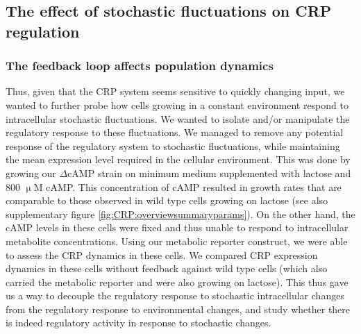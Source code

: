 \subsection*{The effect of stochastic fluctuations on CRP regulation}

\subsubsection*{The feedback loop affects population dynamics}

Thus, given that the CRP system seems sensitive to quickly changing input, we wanted to further probe how cells growing in a constant environment respond to intracellular stochastic fluctuations.
%
%
We wanted to isolate and/or manipulate the regulatory response to these fluctuations.
%
We managed to remove any potential response of the regulatory system to stochastic fluctuations, while maintaining the mean expression level 
required in the cellular environment.
%
This was done by growing our $\Delta$cAMP strain on minimum medium supplemented with lactose and 800 $\upmu$M cAMP.
%
This concentration of cAMP resulted in growth rates that are comparable to those observed in wild type cells growing on lactose (see also supplementary figure \ref{fig:CRP:overviewsummaryparams}).
On the other hand, the cAMP levels in these cells were fixed and thus unable to respond to intracellular metabolite concentrations.
%
Using our metabolic reporter construct, we were able to assess the CRP dynamics in these cells.
We compared CRP expression dynamics in these cells without feedback against wild type cells (which also carried the metabolic reporter and were also growing on lactose).
%
This thus gave us a way to decouple the regulatory response to stochastic intracellular changes from the regulatory response to environmental changes,
and study whether there is indeed regulatory activity in response to stochastic changes.

